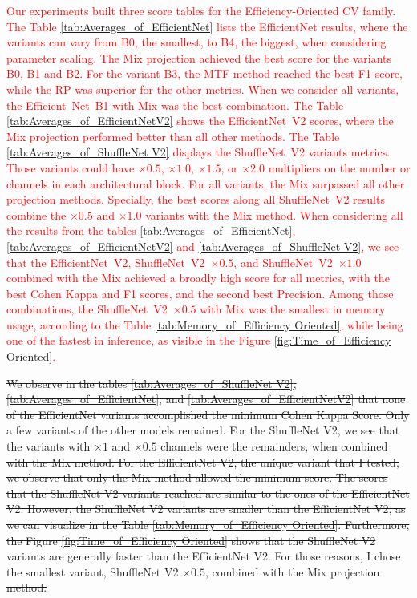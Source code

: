 \textcolor{red}{
Our experiments built three score tables for the Efficiency-Oriented \gls{CV} family.
The Table \ref{tab:Averages_of_EfficientNet} lists the EfficientNet results, where the variants can vary from B0, the smallest, to B4, the biggest, when considering parameter scaling. The \gls{Mix} projection achieved the best score for the variants B0, B1 and B2. For the variant B3, the \gls{MTF} method reached the best F1-score, while the \gls{RP} was superior for the other metrics. When we consider all variants, the \mbox{Efficient Net B1} with \gls{Mix} was the best combination.
The Table \ref{tab:Averages_of_EfficientNetV2} shows the \mbox{EfficientNet V2} scores, where the \gls{Mix} projection performed better than all other methods.
The Table \ref{tab:Averages_of_ShuffleNet V2} displays the \mbox{ShuffleNet V2} variants metrics. Those variants could have $\times 0.5$, $\times 1.0$, $\times 1.5$, or $\times 2.0$ multipliers on the number or channels in each architectural block. For all variants, the \gls{Mix} surpassed all other projection methods. Specially, the best scores along all \mbox{ShuffleNet V2} results combine the $\times 0.5$ and $\times 1.0$ variants with the \gls{Mix} method.
When considering all the results from the tables \ref{tab:Averages_of_EfficientNet}, \ref{tab:Averages_of_EfficientNetV2} and \ref{tab:Averages_of_ShuffleNet V2}, we see that the \mbox{EfficientNet V2}, \mbox{ShuffleNet V2 $\times 0.5$}, and \mbox{ShuffleNet V2 $\times 1.0$} combined with the \gls{Mix} achieved a broadly high score for all metrics, with the best Cohen Kappa and F1 scores, and the second best Precision. Among those combinations, the \mbox{ShuffleNet V2 $\times 0.5$} with \gls{Mix} was the smallest in memory usage, according to the Table \ref{tab:Memory_of_Efficiency Oriented}, while being one of the fastest in inference, as visible in the Figure \ref{fig:Time_of_Efficiency Oriented}.
}

\sout{
We observe in the tables \ref{tab:Averages_of_ShuffleNet V2}, \ref{tab:Averages_of_EfficientNet}, and \ref{tab:Averages_of_EfficientNetV2} that none of the EfficientNet variants accomplished the minimum Cohen Kappa Score. Only a few variants of the other models remained. For the ShuffleNet V2, we see that the variants with $\times 1$ and $\times 0.5$ channels were the remainders, when combined with the \gls{Mix} method. For the EfficientNet V2, the unique variant that I tested, we observe that only the \gls{Mix} method allowed the minimum score. The scores that the ShuffleNet V2 variants reached are similar to the ones of the EfficientNet V2. However, the ShuffleNet V2 variants are smaller than the EfficientNet V2, as we can visualize in the Table \ref{tab:Memory_of_Efficiency Oriented}. Furthermore, the Figure \ref{fig:Time_of_Efficiency Oriented} shows that the ShuffleNet V2 variants are generally faster than the EfficientNet V2. For those reasons, I chose the smallest variant, ShuffleNet V2 $\times 0.5$, combined with the \gls{Mix} projection method. 
}

